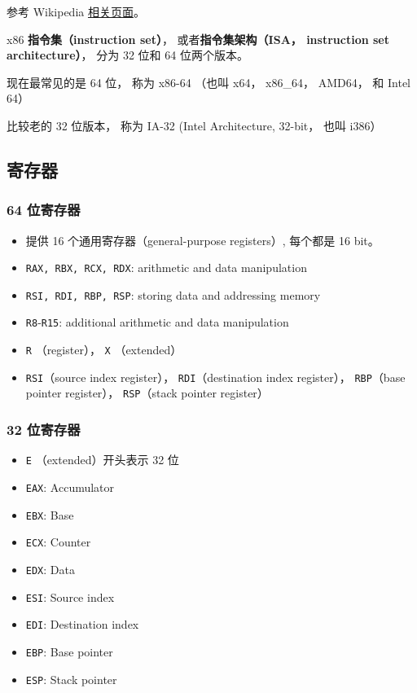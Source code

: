 
\begin{issues}
\issueDraft
\end{issues}

参考 Wikipedia \href{https://en.wikipedia.org/wiki/X86-64}{相关页面}。

x86 \textbf{指令集（instruction set）}， 或者\textbf{指令集架构（ISA， instruction set architecture）}， 分为 32 位和 64 位两个版本。

现在最常见的是 64 位， 称为 x86-64 （也叫 x64， x86_64， AMD64， 和 Intel 64）

比较老的 32 位版本， 称为 IA-32 (Intel Architecture, 32-bit， 也叫 i386）


\subsection{寄存器}
\subsubsection{64 位寄存器}
\begin{itemize}
\item 提供 16 个通用寄存器（general-purpose registers）, 每个都是 16 bit。
\item \verb|RAX, RBX, RCX, RDX|: arithmetic and data manipulation
\item \verb|RSI, RDI, RBP, RSP|: storing data and addressing memory
\item \verb|R8|-\verb|R15|: additional arithmetic and data manipulation
\item \verb|R| （register）， \verb|X| （extended）
\item \verb|RSI|（source index register）， \verb|RDI|（destination index register）， \verb|RBP|（base pointer register）， \verb|RSP|（stack pointer register）
\end{itemize}

\subsubsection{32 位寄存器}
\begin{itemize}
\item \verb|E| （extended）开头表示 32 位
\item \verb|EAX|: Accumulator
\item \verb|EBX|: Base
\item \verb|ECX|: Counter
\item \verb|EDX|: Data
\item \verb|ESI|: Source index
\item \verb|EDI|: Destination index
\item \verb|EBP|: Base pointer
\item \verb|ESP|: Stack pointer
\end{itemize}
